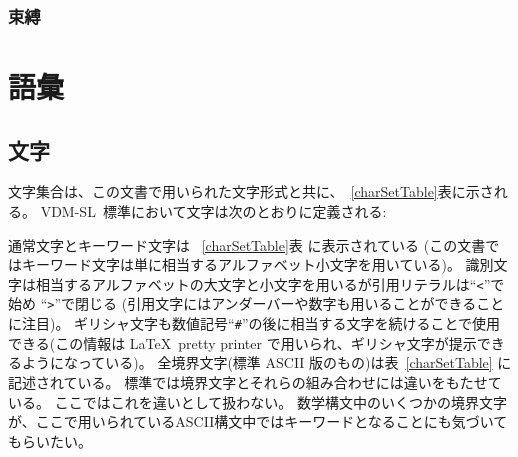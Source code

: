 \documentclass[\pformat,12pt]{jarticle}
\newcommand{\vdmsl}{VDM-SL}
\begin{document}
\subsubsection{束縛}










\section{語彙}\label{app-b}\label{ap:lexis}

\subsection{文字}

文字集合は、この文書で用いられた文字形式と共に、~\ref{charSetTable}表に示される。
 \vdmsl\ 標準において文字は次のとおりに定義される:


通常文字とキーワード文字は ~\ref{charSetTable}表 に表示されている (この文書ではキーワード文字は単に相当するアルファベット小文字を用いている)。 
識別文字は相当するアルファベットの大文字と小文字を用いるが引用リテラルは``{\tt <}''で始め ``{\tt >}''で閉じる (引用文字にはアンダーバーや数字も用いることができることに注目)。 
ギリシャ文字も数値記号``{\tt \#}''の後に相当する文字を続けることで使用できる(この情報は \LaTeX\ pretty printer で用いられ、ギリシャ文字が提示できるようになっている)。 
全境界文字(標準 ASCII 版のもの)は表~\ref{charSetTable} に記述されている。
標準では境界文字とそれらの組み合わせには違いをもたせている。
ここではこれを違いとして扱わない。
数学構文中のいくつかの境界文字が、ここで用いられているASCII構文中ではキーワードとなることにも気づいてもらいたい。
\end{document}
